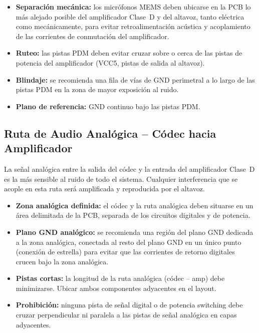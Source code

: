\begin{sibox}
  \begin{itemize}
    \item \textbf{Separación mecánica:} los micrófonos MEMS deben ubicarse
      en la PCB lo más alejado posible del amplificador Clase~D y del altavoz,
      tanto eléctrica como mecánicamente, para evitar retroalimentación acústica
      y acoplamiento de las corrientes de conmutación del amplificador.
    \item \textbf{Ruteo:} las pistas PDM deben evitar cruzar sobre o cerca de las
      pistas de potencia del amplificador (VCC5, pistas de salida al altavoz).
    \item \textbf{Blindaje:} se recomienda una fila de vías de GND perimetral a
      lo largo de las pistas PDM en la zona de mayor exposición al ruido.
    \item \textbf{Plano de referencia:} GND continuo bajo las pistas PDM.
  \end{itemize}
\end{sibox}

\subsection{Ruta de Audio Analógica -- Códec hacia Amplificador}
\label{subsec:si_audio_analog}

La señal analógica entre la salida del códec y la entrada del amplificador Clase~D
es la más sensible al ruido de todo el sistema. Cualquier interferencia que se
acople en esta ruta será amplificada y reproducida por el altavoz.

\begin{sibox}
  \begin{itemize}
    \item \textbf{Zona analógica definida:} el códec y la ruta analógica deben
      situarse en un área delimitada de la PCB, separada de los circuitos digitales
      y de potencia.
    \item \textbf{Plano GND analógico:} se recomienda una región del plano GND
      dedicada a la zona analógica, conectada al resto del plano GND en un único
      punto (conexión de estrella) para evitar que las corrientes de retorno digitales
      crucen bajo la zona analógica.
    \item \textbf{Pistas cortas:} la longitud de la ruta analógica (códec -- amp)
      debe minimizarse. Ubicar ambos componentes adyacentes en el layout.
    \item \textbf{Prohibición:} ninguna pista de señal digital o de potencia
      switching debe cruzar perpendicular ni paralela a las pistas de señal analógica
      en capas adyacentes.
  \end{itemize}
\end{sibox}

